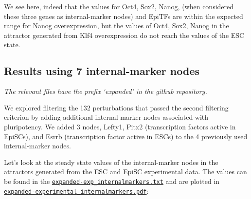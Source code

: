\documentclass[
]{book}
\begin{document}
We see here, indeed that the values for Oct4, Sox2, Nanog, (when considered these three genes as internal-marker nodes) and EpiTFs are within the expected range for Nanog overexpression, but the values of Oct4, Sox2, Nanog in the attractor generated from Klf4 overexpression do not reach the values of the ESC state.

\hypertarget{results-using-7-internal-marker-nodes}{%
\subsection{Results using 7 internal-marker nodes}\label{results-using-7-internal-marker-nodes}}

\emph{The relevant files have the prefix `expanded' in the github repository.}

We explored filtering the 132 perturbations that passed the second filtering criterion by adding additional internal-marker nodes associated with pluripotency. We added 3 nodes, Lefty1, Pitx2 (transcription factors active in EpiSCs), and Esrrb (transcription factor active in ESCs) to the 4 previously used internal-marker nodes.

Let's look at the steady state values of the internal-marker nodes in the attractors generated from the ESC and EpiSC experimental data. The values can be found in the \href{https://github.com/VeraLiconaResearchGroup/Netisce/blob/main/ipsc_validation/results/expanded-exp_internalmarkers.txt}{\texttt{expanded-exp\_internalmarkers.txt}} and are plotted in \href{https://github.com/VeraLiconaResearchGroup/Netisce/blob/main/ipsc_validation/results/expanded-experimental_internalmarkers.pdf}{\texttt{expanded-experimental\_internalmarkers.pdf}}:
\end{document}
